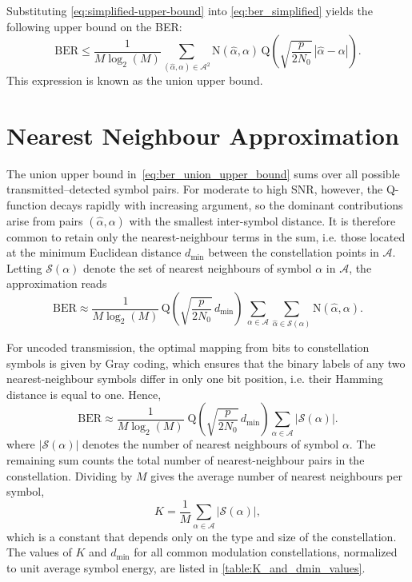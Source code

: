 Substituting \eqref{eq:simplified-upper-bound} into \eqref{eq:ber_simplified} yields the following upper bound on the \ac{BER}:
\begin{equation}
\label{eq:ber_union_upper_bound}
    \mathrm{BER} \leq \frac{1}{M \log_2(M)} \sum_{(\hat{\alpha}, \alpha) \in \mathcal{A}^{2}} \mathrm{N}(\hat{\alpha}, \alpha) \, \mathrm{Q} \left( \sqrt{\frac{p}{2 N_0}} \, |\hat{\alpha} - \alpha| \right).
\end{equation}
This expression is known as the union upper bound.

\section{Nearest Neighbour Approximation}
\label{appendix_section:nn_approximation}

The union upper bound in~\eqref{eq:ber_union_upper_bound} sums over all possible transmitted--detected symbol pairs.
For moderate to high \ac{SNR}, however, the Q-function decays rapidly with increasing argument, so the dominant contributions arise from pairs $(\hat{\alpha}, \alpha)$ with the smallest inter-symbol distance.
It is therefore common to retain only the nearest-neighbour terms in the sum, i.e. those located at the minimum Euclidean distance $d_{\min}$ between the constellation points in $\mathcal{A}$.
Letting $\mathcal{S}(\alpha)$ denote the set of nearest neighbours of symbol $\alpha$ in $\mathcal{A}$, the approximation reads
\begin{equation}
\label{eq:ber_nn_approximation_with_N}
    \mathrm{BER} 
    \approx \frac{1}{M \log_2(M)} \, \mathrm{Q}\!\left(\sqrt{\frac{p}{2N_0}}\,d_{\min}\right) \, \sum_{\alpha \in \mathcal{A}} \sum_{\hat{\alpha} \in \mathcal{S}(\alpha)} \mathrm{N}(\hat{\alpha}, \alpha).
\end{equation}

For uncoded transmission, the optimal mapping from bits to constellation symbols is given by Gray coding, which ensures that the binary labels of any two nearest-neighbour symbols differ in only one bit position, i.e. their Hamming distance is equal to one.
Hence,
\begin{equation}
    \mathrm{BER} \approx \frac{1}{M \log_2(M)}\; \mathrm{Q}\!\left(\sqrt{\frac{p}{2N_0}}\,d_{\min}\right) \sum_{\alpha \in \mathcal{A}} |\mathcal{S}(\alpha)|.
\end{equation}
where $|\mathcal{S}(\alpha)|$ denotes the number of nearest neighbours of symbol $\alpha$.
The remaining sum counts the total number of nearest-neighbour pairs in the constellation.
Dividing by $M$ gives the average number of nearest neighbours per symbol,
\begin{equation}
    K = \frac{1}{M} \sum_{\alpha \in \mathcal{A}} |\mathcal{S}(\alpha)|,
\end{equation}
which is a constant that depends only on the type and size of the constellation.
The values of $K$ and $d_{\min}$ for all common modulation constellations, normalized to unit average symbol energy, are listed in \autoref{table:K_and_dmin_values}.

